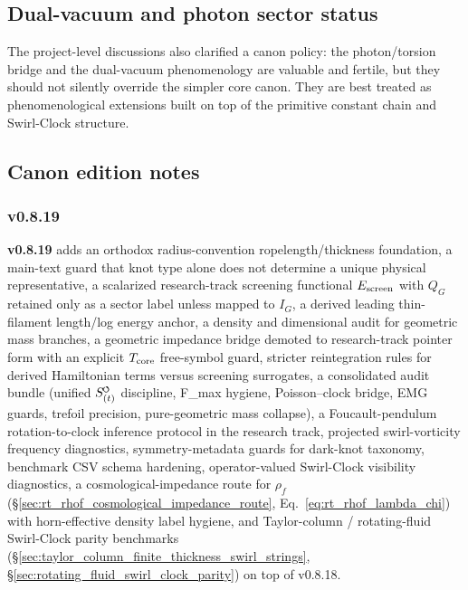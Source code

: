 \documentclass[11pt]{article}
\theoremstyle{definition}
\theoremstyle{plain}
\theoremstyle{remark}
\newcommand{\swirlarrow}{\mathchoice{\mkern-2mu\scriptstyle\boldsymbol{\circlearrowleft}}{\mkern-2mu\scriptstyle\boldsymbol{\circlearrowleft}}{\mkern-2mu\scriptscriptstyle\boldsymbol{\circlearrowleft}}{\mkern-2mu\scriptscriptstyle\boldsymbol{\circlearrowleft}}}
\newcommand{\SwirlClock}{{S_{(t)}^{\swirlarrow}}}
\begin{document}
        \subsection{Dual-vacuum and photon sector status}
            The project-level discussions also clarified a canon policy: the photon/torsion bridge and the dual-vacuum phenomenology are valuable and fertile, but they should not silently override the simpler core canon. They are best treated as phenomenological extensions built on top of the primitive constant chain and Swirl-Clock structure.

        \subsection{Canon edition notes}

        \subsubsection{v0.8.19}
            \textbf{v0.8.19} adds an orthodox radius-convention ropelength/thickness foundation, a main-text guard that knot type alone does not determine a unique physical representative, a scalarized research-track screening functional \(E_{\rm screen}\) with \(Q_G\) retained only as a sector label unless mapped to \(I_G\), a derived leading thin-filament length/log energy anchor, a density and dimensional audit for geometric mass branches, a geometric impedance bridge demoted to research-track pointer form with an explicit \(T_{\rm core}\) free-symbol guard, stricter reintegration rules for derived Hamiltonian terms versus screening surrogates, a consolidated audit bundle (unified \(\SwirlClock\) discipline, F\_max hygiene, Poisson--clock bridge, EMG guards, trefoil precision, pure-geometric mass collapse), a Foucault-pendulum rotation-to-clock inference protocol in the research track, projected swirl-vorticity frequency diagnostics, symmetry-metadata guards for dark-knot taxonomy, benchmark CSV schema hardening, operator-valued Swirl-Clock visibility diagnostics, a cosmological-impedance route for \(\rho_f\) (\S\ref{sec:rt_rhof_cosmological_impedance_route}, Eq.~\ref{eq:rt_rhof_lambda_chi}) with horn-effective density label hygiene, and Taylor-column / rotating-fluid Swirl-Clock parity benchmarks (\S\ref{sec:taylor_column_finite_thickness_swirl_strings}, \S\ref{sec:rotating_fluid_swirl_clock_parity}) on top of v0.8.18.
\end{document}
